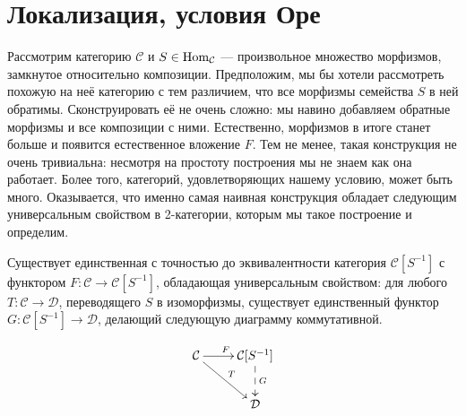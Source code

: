 \documentclass[../main.tex]{subfiles}
\begin{document}
\section{Локализация, условия Оре}

Рассмотрим категорию $\mathcal{C}$ и $S\in \operatorname{Hom}_\mathcal{C}$ --- произвольное множество морфизмов, замкнутое относительно композиции. 
Предположим, мы бы хотели рассмотреть похожую на неё категорию с тем различием, что все морфизмы семейства $S$ в ней обратимы. 
Сконструировать её не очень сложно: мы навино добавляем обратные морфизмы и все композиции с ними. 
Естественно, морфизмов в итоге станет больше и появится естественное вложение $F$. 
Тем не менее, такая конструкция не очень тривиальна: несмотря на простоту построения мы не знаем как она работает. 
Более того, категорий, удовлетворяющих нашему условию, может быть много. 
Оказывается, что именно самая наивная конструкция обладает следующим универсальным свойством в 2-категории, которым мы такое построение и определим.

\begin{to_suj}
  Существует единственная с точностью до эквивалентности категория $\mathcal{C}[S^{-1}]$ с функтором $F:\mathcal{C}\to \mathcal{C}[S^{-1}]$, обладающая универсальным свойством: для любого $T:\mathcal{C}\to \mathcal{D}$, переводящего $S$ в изоморфизмы, существует единственный функтор $G:\mathcal{C}[S^{-1}] \to \mathcal{D}$, делающий следующую диаграмму коммутативной.

  \begin{equation}\label{loc_univ}
  \xymatrix{
      \mathcal{C}\ar[rd]^T \ar[r]^F & \mathcal{C}[S^{-1}]\ar@{-->}[d]^G\\
  & \mathcal{D} }
\end{equation}

\end{to_suj}
\end{document}
